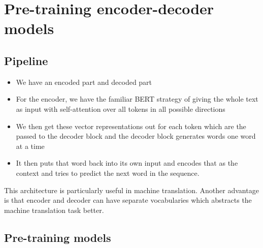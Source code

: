 \documentclass[11pt]{article}
\begin{document}
\section{Pre-training encoder-decoder models}

\subsection{Pipeline}

\begin{minipage}[l]{.5\linewidth}
    \begin{figure}[H]
        \centering
    \end{figure}    
\end{minipage}\hfill
\begin{minipage}[r]{.48\linewidth}
    \begin{itemize}
        \item We have an encoded part and decoded part
        \item For the encoder, we have the familiar BERT strategy of giving the whole text as input with self-attention over all tokens in all possible directions
        \item We then get these vector representations out for each token which are the passed to the decoder block and the decoder block generates words one word at a time 
        \item It then puts that word back into its own input and encodes that as the context and tries to predict the next word in the sequence.
    \end{itemize}
\end{minipage}

This architecture is particularly useful in machine translation. Another advantage is that encoder and decoder can have separate vocabularies which abstracts the machine translation task better.

\subsection{Pre-training models}

\begin{figure}[H]
    \centering
\end{figure}    
\end{document}
